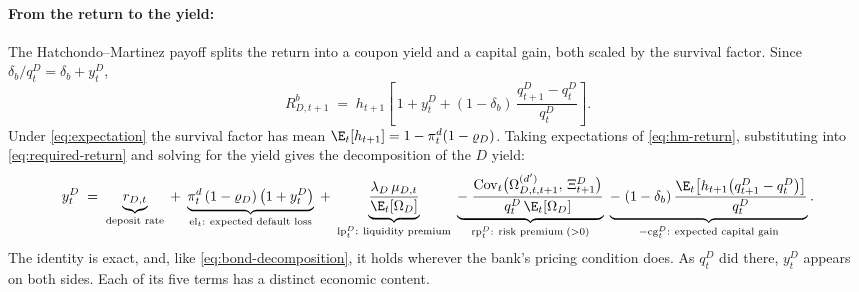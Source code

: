 \paragraph{From the return to the yield:}
The Hatchondo--Martinez payoff splits the return into a coupon yield and a
capital gain, both scaled by the survival factor. Since
$\delta_b/q^{D}_t=\delta_b+y^{D}_t$,
\begin{equation}
R^{b}_{D,t+1}
\;=\;h_{t+1}\left[\,1+y^{D}_t
+(1-\delta_b)\,\frac{q^{D}_{t+1}-q^{D}_t}{q^{D}_t}\right].
\label{eq:hm-return}
\end{equation}
Under \eqref{eq:expectation} the survival factor has mean
$\E_t[h_{t+1}]=1-\pi^{d}_t(1-\varrho_D)$. Taking expectations of
\eqref{eq:hm-return}, substituting into \eqref{eq:required-return} and solving for
the yield gives the decomposition of the $D$ yield:
\begin{equation}
y^{D}_t
\;=\;\underbrace{r_{D,t}}_{\text{deposit rate}}
\;+\;\underbrace{\pi^{d}_t\,(1-\varrho_D)\,\bigl(1+y^{D}_t\bigr)}_{\mathrm{el}_t:\ \text{expected default loss}}
\;+\;\underbrace{\frac{\lambda_D\,\mu_{D,t}}{\E_t[\Omega_D]}}_{\mathrm{lp}^{D}_t:\ \text{liquidity premium}}
\;\underbrace{-\;\frac{\mathrm{Cov}_t\bigl(\Omega^{(d')}_{D,t,t+1},\,\Xi^{D}_{t+1}\bigr)}
         {q^{D}_t\,\E_t[\Omega_D]}}_{\mathrm{rp}^{D}_t:\ \text{risk premium}\;(>0)}
\;\underbrace{-\;(1-\delta_b)\,\frac{\E_t\bigl[h_{t+1}\bigl(q^{D}_{t+1}-q^{D}_t\bigr)\bigr]}{q^{D}_t}}_{-\mathrm{cg}^{D}_t:\ \text{expected capital gain}} .
\label{eq:yield-decomposition-D}
\end{equation}
The identity is exact, and, like \eqref{eq:bond-decomposition}, it holds wherever
the bank's pricing condition does. As $q^{D}_t$ did there, $y^{D}_t$ appears on
both sides. Each of its five terms has a distinct economic content.
